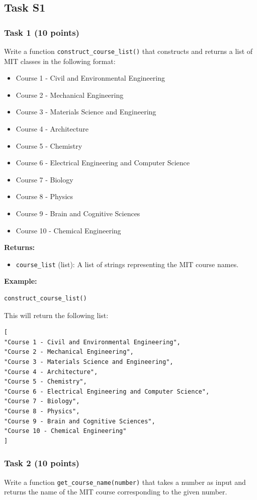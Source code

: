 \documentclass[12pt]{article}
\begin{document}
\subsection{Task S1}

\subsubsection{Task 1 (10 points)}
Write a function \texttt{construct\_course\_list()} that constructs and returns a list of MIT classes in the following format:

\begin{itemize}
\item Course 1 - Civil and Environmental Engineering
\item Course 2 - Mechanical Engineering
\item Course 3 - Materials Science and Engineering
\item Course 4 - Architecture
\item Course 5 - Chemistry
\item Course 6 - Electrical Engineering and Computer Science
\item Course 7 - Biology
\item Course 8 - Physics
\item Course 9 - Brain and Cognitive Sciences
\item Course 10 - Chemical Engineering
\end{itemize}

\textbf{Returns:}
\begin{itemize}
\item \texttt{course\_list} (list): A list of strings representing the MIT course names.
\end{itemize}

\textbf{Example:}
\begin{lstlisting}[language=Python]
construct_course_list()
\end{lstlisting}
This will return the following list:
\begin{verbatim}
[
"Course 1 - Civil and Environmental Engineering",
"Course 2 - Mechanical Engineering",
"Course 3 - Materials Science and Engineering",
"Course 4 - Architecture",
"Course 5 - Chemistry",
"Course 6 - Electrical Engineering and Computer Science",
"Course 7 - Biology",
"Course 8 - Physics",
"Course 9 - Brain and Cognitive Sciences",
"Course 10 - Chemical Engineering"
]
\end{verbatim}

\subsubsection{Task 2 (10 points)}
Write a function \texttt{get\_course\_name(number)} that takes a number as input and returns the name of the MIT course corresponding to the given number.
\end{document}
